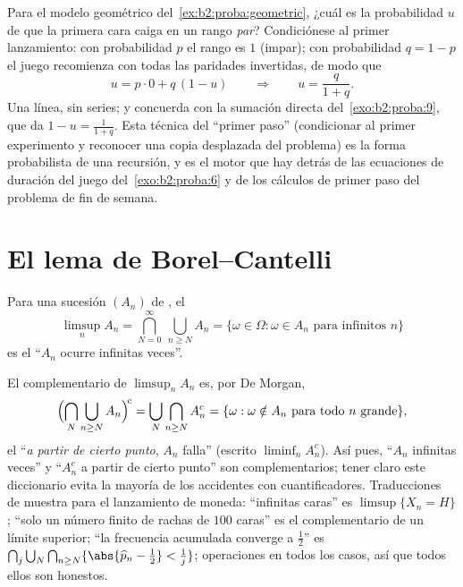 \begin{example}\label{ex:b2:proba:firststep}
Para el modelo geométrico del~\cref{ex:b2:proba:geometric}, ¿cuál es
la probabilidad $u$ de que la primera cara caiga en un rango
\emph{par}? Condiciónese al primer lanzamiento: con probabilidad $p$
el rango es $1$ (impar); con probabilidad $q = 1 - p$ el juego
recomienza con todas las paridades invertidas, de modo que
\[
u = p\cdot0 + q\,(1 - u)
\qquad\Longrightarrow\qquad
u = \frac{q}{1 + q} .
\]
Una línea, sin series; y concuerda con la sumación directa del~\cref{exo:b2:proba:9}, que da $1 - u = \frac1{1+q}$. Esta técnica del
``primer paso'' (condicionar al primer experimento y reconocer una
copia desplazada del problema) es la forma probabilista de una
recursión, y es el motor que hay detrás de las ecuaciones de duración
del juego del~\cref{exo:b2:proba:6} y de los cálculos de primer paso
del problema de fin de semana.
\end{example}

\section{El lema de Borel--Cantelli}

\begin{definition}\label{def:b2:proba:limsup}
Para una sucesión $(A_n)$ de , el 
\[
\limsup_n A_n
= \bigcap_{N=0}^{\infty}\ \bigcup_{n \geq N} A_n
= \{\omega \in \Omega : \omega \in A_n
\text{ para infinitos } n\}
\]
es el  ``$A_n$ ocurre infinitas veces''.
\end{definition}

\begin{example}\label{ex:b2:proba:limsuplang}
El complementario de $\limsup_nA_n$ es, por De Morgan,
\[
\Bigl(\bigcap_N\bigcup_{n\geq N}A_n\Bigr)^{\!c}
= \bigcup_N\bigcap_{n\geq N}A_n^c
= \{\omega : \omega \notin A_n \text{ para todo }n\text{
grande}\},
\]
el  ``\emph{a partir de cierto punto}, $A_n$ falla'' (escrito
$\liminf_nA_n^c$). Así pues, ``$A_n$ infinitas veces'' y ``$A_n^c$ a
partir de cierto punto'' son complementarios; tener claro este
diccionario evita la mayoría de los accidentes con cuantificadores.
Traducciones de muestra para el lanzamiento de moneda: ``infinitas
caras'' es $\limsup\{X_n = H\}$; ``solo un número finito de rachas de
$100$ caras'' es el complementario de un límite superior; ``la
frecuencia acumulada converge a $\frac12$'' es
$\bigcap_j\bigcup_N\bigcap_{n\geq N}\{\abs{\widehat p_n -
\tfrac12} < \tfrac1j\}$; operaciones  en todos los casos,
así que todos ellos son  honestos.
\end{example}


